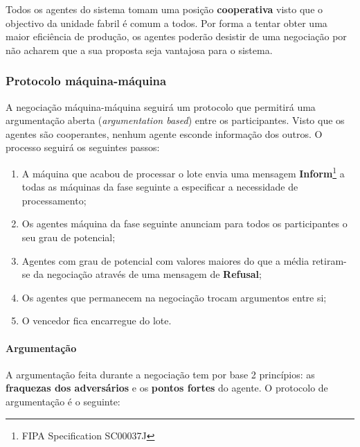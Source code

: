 \begin{titlepage}
Todos os agentes do sistema tomam uma posição \textbf{cooperativa} visto que o objectivo da unidade fabril é comum a todos. Por forma a tentar obter uma maior eficiência de produção, os agentes poderão desistir de uma negociação por não acharem que a sua proposta seja vantajosa para o sistema.

\subsubsection{Protocolo máquina-máquina} \label{maq-maq}

A negociação máquina-máquina seguirá um protocolo que permitirá uma argumentação aberta (\textit{argumentation based}) entre os participantes. Visto que os agentes são cooperantes, nenhum agente esconde informação dos outros. O processo seguirá os seguintes passos:

\begin{enumerate}
\item A máquina que acabou de processar o lote envia uma mensagem \textbf{Inform}\footnote{FIPA Specification SC00037J\cite{fipa}} a todas as máquinas da fase seguinte a especificar a necessidade de processamento;
\item Os agentes máquina da fase seguinte anunciam para todos os participantes o seu grau de potencial;
\item Agentes com grau de potencial com valores maiores do que a média retiram-se da negociação através de uma mensagem de \textbf{Refusal};
\item Os agentes que permanecem na negociação trocam argumentos entre si;
\item O vencedor fica encarregue do lote.
\end{enumerate}

\paragraph{Argumentação}

A argumentação feita durante a negociação tem por base 2 princípios: as \textbf{fraquezas dos adversários} e os \textbf{pontos fortes} do agente. O protocolo de argumentação é o seguinte:


\end{titlepage}
